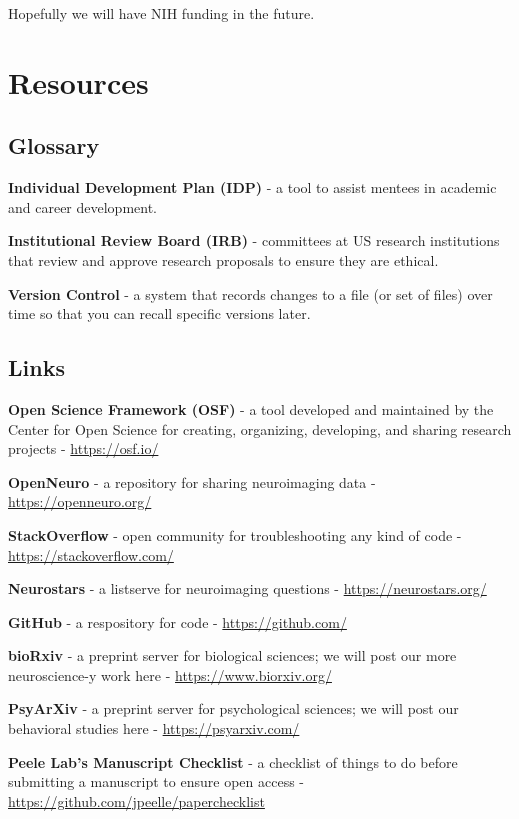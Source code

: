 \documentclass[]{book}
\begin{document}
Hopefully we will have NIH funding in the future.

\hypertarget{resources}{%
\chapter{Resources}\label{resources}}

\hypertarget{glossary}{%
\section{Glossary}\label{glossary}}

\textbf{Individual Development Plan (IDP)} - a tool to assist mentees in academic and career development.

\textbf{Institutional Review Board (IRB)} - committees at US research institutions that review and approve research proposals to ensure they are ethical.

\textbf{Version Control} - a system that records changes to a file (or set of files) over time so that you can recall specific versions later.

\hypertarget{links}{%
\section{Links}\label{links}}

\textbf{Open Science Framework (OSF)} - a tool developed and maintained by the Center for Open Science for creating, organizing, developing, and sharing research projects - \url{https://osf.io/}

\textbf{OpenNeuro} - a repository for sharing neuroimaging data - \url{https://openneuro.org/}

\textbf{StackOverflow} - open community for troubleshooting any kind of code - \url{https://stackoverflow.com/}

\textbf{Neurostars} - a listserve for neuroimaging questions - \url{https://neurostars.org/}

\textbf{GitHub} - a respository for code - \url{https://github.com/}

\textbf{bioRxiv} - a preprint server for biological sciences; we will post our more neuroscience-y work here - \url{https://www.biorxiv.org/}

\textbf{PsyArXiv} - a preprint server for psychological sciences; we will post our behavioral studies here - \url{https://psyarxiv.com/}

\textbf{Peele Lab's Manuscript Checklist} - a checklist of things to do before submitting a manuscript to ensure open access - \url{https://github.com/jpeelle/paperchecklist}


\end{document}
